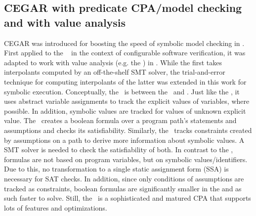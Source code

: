 \subsection*{CEGAR with predicate CPA/model checking and with value analysis}
CEGAR was introduced for boosting the speed of symbolic model checking in \cite{Clarke2003}.
First applied to the \predicateCPA\ \cite{Beyer2012} in the context of configurable software verification,
it was adapted to work with value analysis (e.g. the ) in \cite{Beyer2013}.
While the first takes interpolants computed by an off-the-shelf SMT solver, the trial-and-error technique
for computing interpolants of the latter was extended in this work for symbolic execution.
Conceptually, the \symbolicExecutionCPA\ is between the \ and \predicateCPA.
Just like the , it uses abstract variable assignments to track the explicit values of variables, where possible.
In addition, symbolic values are tracked for values of unknown explicit value.
The \predicateCPA\ creates a boolean formula over a program path's statements and assumptions and checks its satisfiability.
Similarly, the \symbolicExecutionCPA\ tracks constraints created by assumptions on a path to derive more information about symbolic values.
A SMT solver is needed to check the satisfiability of both.
In contrast to the \predicateCPA, formulas are not based on program variables, but on symbolic values/identifiers.
Due to this, no transformation to a single static assignment form (SSA) is necessary for SAT checks.
In addition, since only conditions of assumptions are tracked as constraints, boolean formulas are significantly smaller in the \symbolicExecutionCPA
and as such faster to solve.
Still, the \predicateCPA\ is a sophisticated and matured CPA that supports lots of features and optimizations.
